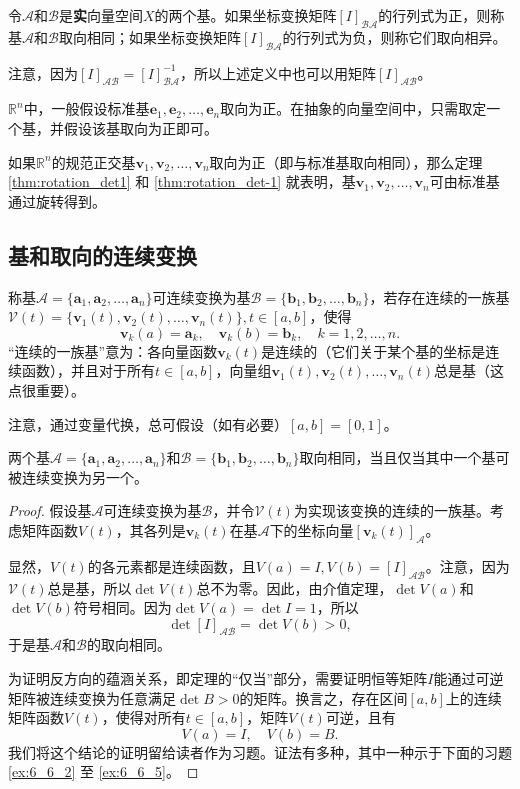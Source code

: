 令$\mathcal{A}$和$\mathcal{B}$是{\bf 实}向量空间$X$的两个基。如果坐标变换矩阵$[I]_\mathcal{BA}$的行列式为正，则称基$\mathcal{A}$和$\mathcal{B}$取向相同；如果坐标变换矩阵$[I]_\mathcal{BA}$的行列式为负，则称它们取向相异。

注意，因为$[I]_\mathcal{AB}=[I]_\mathcal{BA}^{-1}$，所以上述定义中也可以用矩阵$[I]_\mathcal{AB}$。

$\mathbb{R}^n$中，一般假设标准基$\mathbf{e}_1,\mathbf{e}_2,\dots,\mathbf{e}_n$取向为正。在抽象的向量空间中，只需取定一个基，并假设该基取向为正即可。

如果$\mathbb{R}^n$的规范正交基$\mathbf{v}_1,\mathbf{v}_2,\dots,\mathbf{v}_n$取向为正（即与标准基取向相同），那么定理 \ref{thm:rotation_det1} 和 \ref{thm:rotation_det-1} 就表明，基$\mathbf{v}_1,\mathbf{v}_2,\dots,\mathbf{v}_n$可由标准基通过旋转得到。

\subsection{基和取向的连续变换}

\begin{definition*}
    称基$\mathcal{A}=\{\mathbf{a}_1,\mathbf{a}_2,\dots,\mathbf{a}_n\}$可连续变换为基$\mathcal{B}=\{\mathbf{b}_1,\mathbf{b}_2,\dots,\mathbf{b}_n\}$，若存在连续的一族基$\mathcal{V}(t)=\{\mathbf{v}_1(t),\mathbf{v}_2(t),\dots,\mathbf{v}_n(t)\},t\in[a,b]$，使得
    \[\mathbf{v}_k(a)=\mathbf{a}_k,\quad \mathbf{v}_k(b)=\mathbf{b}_k,\quad k=1,2,\dots,n.\]
    “连续的一族基”意为：各向量函数$\mathbf{v}_k(t)$是连续的（它们关于某个基的坐标是连续函数），并且对于所有$t\in[a,b]$，向量组$\mathbf{v}_1(t),\mathbf{v}_2(t),\dots,\mathbf{v}_n(t)$总是基（这点很重要）。
\end{definition*}

注意，通过变量代换，总可假设（如有必要）$[a,b]=[0,1]$。

\begin{theorem}\label{thm:orientation_continuous_trans}
    两个基$\mathcal{A}=\{\mathbf{a}_1,\mathbf{a}_2,\dots,\mathbf{a}_n\}$和$\mathcal{B}=\{\mathbf{b}_1,\mathbf{b}_2,\dots,\mathbf{b}_n\}$取向相同，当且仅当其中一个基可被连续变换为另一个。
\end{theorem}

\begin{proof}
    假设基$\mathcal{A}$可连续变换为基$\mathcal{B}$，并令$\mathcal{V}(t)$为实现该变换的连续的一族基。考虑矩阵函数$V(t)$，其各列是$\mathbf{v}_k(t)$在基$\mathcal{A}$下的坐标向量$[\mathbf{v}_k(t)]_\mathcal{A}$。

    显然，$V(t)$的各元素都是连续函数，且$V(a)=I,V(b)=[I]_\mathcal{AB}$。注意，因为$\mathcal{V}(t)$总是基，所以$\det V(t)$总不为零。因此，由介值定理，$\det V(a)$和$\det V(b)$符号相同。因为$\det V(a)=\det I=1$，所以\[\det [I]_\mathcal{AB}=\det V(b)>0,\]于是基$\mathcal{A}$和$\mathcal{B}$的取向相同。

    为证明反方向的蕴涵关系，即定理的“仅当”部分，需要证明恒等矩阵$I$能通过可逆矩阵被连续变换为任意满足$\det B>0$的矩阵。换言之，存在区间$[a,b]$上的连续矩阵函数$V(t)$，使得对所有$t\in [a,b]$，矩阵$V(t)$可逆，且有
    \[V(a)=I,\quad V(b)=B.\]
    我们将这个结论的证明留给读者作为习题。证法有多种，其中一种示于下面的习题 \ref{ex:6_6_2} 至 \ref{ex:6_6_5}。
\end{proof}

